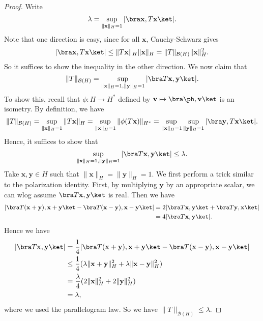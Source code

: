 \documentclass[a4paper]{article}
\begin{document}
\begin{proof}
  Write
  \[
    \lambda = \sup_{\|\mathbf{x}\|_H = 1} |\bra \mathbf{x}, T \mathbf{x}\ket|.
  \]
  Note that one direction is easy, since for all $\mathbf{x}$, Cauchy-Schwarz gives
  \[
    |\bra \mathbf{x}, T \mathbf{x}\ket| \leq \|T\mathbf{x}\|_H \|\mathbf{x}\|_H = \|T\|_{\mathcal{B}(H)} \|\mathbf{x}\|_H^2.
  \]
  So it suffices to show the inequality in the other direction. We now claim that
  \[
    \|T\|_{\mathcal{B}(H)} = \sup_{\|\mathbf{x}\|_H = 1, \|\mathbf{y}\|_H = 1} |\bra T\mathbf{x}, \mathbf{y}\ket|.
  \]
  To show this, recall that $\phi: H \to H^*$ defined by $\mathbf{v} \mapsto \bra \ph, \mathbf{v}\ket$ is an isometry. By definition, we have
  \[
    \|T\|_{\mathcal{B}(H)} = \sup_{\|\mathbf{x}\|_H = 1} \|T \mathbf{x}\|_H = \sup_{\|\mathbf{x}\|_H = 1} \|\phi(T \mathbf{x})\|_{H^*} = \sup_{\|\mathbf{x}\|_H = 1}\sup_{\|\mathbf{y}\|_H = 1} |\bra \mathbf{y}, T \mathbf{x}\ket|.
  \]
  Hence, it suffices to show that
  \[
    \sup_{\|\mathbf{x}\|_H = 1, \|\mathbf{y}\|_H = 1} |\bra T\mathbf{x}, \mathbf{y}\ket| \leq \lambda.
  \]
  Take $\mathbf{x}, \mathbf{y} \in H$ such that $\|\mathbf{x}\|_H = \|\mathbf{y}\|_H = 1$. We first perform a trick similar to the polarization identity. First, by multiplying $\mathbf{y}$ by an appropriate scalar, we can wlog assume $\bra T\mathbf{x}, \mathbf{y}\ket$ is real. Then we have
  \begin{align*}
    |\bra T(\mathbf{x} + \mathbf{y}), \mathbf{x} + \mathbf{y} \ket - \bra T(\mathbf{x} - \mathbf{y}), \mathbf{x} - \mathbf{y}\ket| &= 2 |\bra T\mathbf{x}, \mathbf{y}\ket + \bra T \mathbf{y}, \mathbf{x}\ket|\\
    &= 4 |\bra T \mathbf{x}, \mathbf{y}\ket|.
  \end{align*}
  Hence we have
  \begin{align*}
    |\bra T \mathbf{x}, \mathbf{y}\ket| &= \frac{1}{4}|\bra T(\mathbf{x} + \mathbf{y}), \mathbf{x} + \mathbf{y} \ket - \bra T(\mathbf{x} - \mathbf{y}), \mathbf{x} - \mathbf{y}\ket|\\
    &\leq \frac{1}{4} (\lambda \|\mathbf{x} + \mathbf{y}\|_H^2 + \lambda \|\mathbf{x} - \mathbf{y}\|_H^2)\\
    &= \frac{\lambda}{4} (2\|\mathbf{x}\|_H^2 + 2 \|\mathbf{y}\|_H^2)\\
    &= \lambda,
  \end{align*}
  where we used the parallelogram law. So we have $\|T\|_{\mathcal{B}(H)} \leq \lambda$.
\end{proof}
\end{document}
